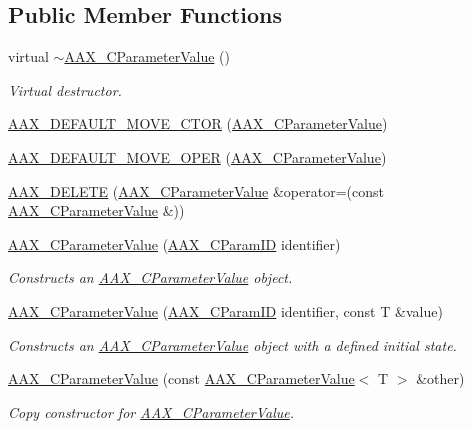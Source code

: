 \subsection*{Public Member Functions}
\begin{DoxyCompactItemize}
\item 
virtual \hyperlink{a00035_a91b8b569685838227abd5e335344b6d7}{$\sim$\+A\+A\+X\+\_\+\+C\+Parameter\+Value} ()
\begin{DoxyCompactList}\small\item\em Virtual destructor. \end{DoxyCompactList}\item 
\hyperlink{a00035_aeeaf69b0c6c9bb83911b9e160b3b7c7f}{A\+A\+X\+\_\+\+D\+E\+F\+A\+U\+L\+T\+\_\+\+M\+O\+V\+E\+\_\+\+C\+T\+O\+R} (\hyperlink{a00035}{A\+A\+X\+\_\+\+C\+Parameter\+Value})
\item 
\hyperlink{a00035_a04b9dbdf97b7b3d3e33286ade8d2f2fb}{A\+A\+X\+\_\+\+D\+E\+F\+A\+U\+L\+T\+\_\+\+M\+O\+V\+E\+\_\+\+O\+P\+E\+R} (\hyperlink{a00035}{A\+A\+X\+\_\+\+C\+Parameter\+Value})
\item 
\hyperlink{a00035_ac63dcc7a4774d7518e9651dda9012c2e}{A\+A\+X\+\_\+\+D\+E\+L\+E\+T\+E} (\hyperlink{a00035}{A\+A\+X\+\_\+\+C\+Parameter\+Value} \&operator=(const \hyperlink{a00035}{A\+A\+X\+\_\+\+C\+Parameter\+Value} \&))
\item 
\hyperlink{a00035_ac4f0d65eb080c32073138f5a1fa833d1}{A\+A\+X\+\_\+\+C\+Parameter\+Value} (\hyperlink{a00149_a1440c756fe5cb158b78193b2fc1780d1}{A\+A\+X\+\_\+\+C\+Param\+I\+D} identifier)
\begin{DoxyCompactList}\small\item\em Constructs an \hyperlink{a00035}{A\+A\+X\+\_\+\+C\+Parameter\+Value} object. \end{DoxyCompactList}\item 
\hyperlink{a00035_a7d1e7a3e8977f19e70c468a6ca60f5ca}{A\+A\+X\+\_\+\+C\+Parameter\+Value} (\hyperlink{a00149_a1440c756fe5cb158b78193b2fc1780d1}{A\+A\+X\+\_\+\+C\+Param\+I\+D} identifier, const T \&value)
\begin{DoxyCompactList}\small\item\em Constructs an \hyperlink{a00035}{A\+A\+X\+\_\+\+C\+Parameter\+Value} object with a defined initial state. \end{DoxyCompactList}\item 
\hyperlink{a00035_a7da2ed60a10806f3c41b69ba15c9af0a}{A\+A\+X\+\_\+\+C\+Parameter\+Value} (const \hyperlink{a00035}{A\+A\+X\+\_\+\+C\+Parameter\+Value}$<$ T $>$ \&other)
\begin{DoxyCompactList}\small\item\em Copy constructor for \hyperlink{a00035}{A\+A\+X\+\_\+\+C\+Parameter\+Value}. \end{DoxyCompactList}\item 

\end{DoxyCompactItemize}
